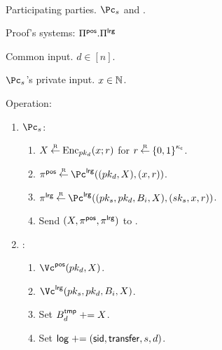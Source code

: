 \begin{protocol}~\label{prot:ConfidentialTransactions:Transfer}
	\item[Participating parties.] $\Pc_s$ and \Cc.
	
	\item[Proof's systems:] $\Pi^{\mathsf{pos}}.\Pi^{\mathsf{lrg}}$
	\item[Common input.] $d \in [n]$.
	
	
	\item[$\Pc_s$'s private  input.] $x \in {\mathbb{N}}$.
	
	\item Operation: 
	
	\begin{enumerate}
		\item  $\Pc_s$: 
		
		\begin{enumerate}
			\item $X \mathbin{\stackrel{\mbox{\tiny R}}{\leftarrow}} \operatorname{Enc}_{pk_d}(x;r)$ for $r \getsr \zo^\ckappa$.
			
			\item $\pi^\posvst \getsr \Pc^\largest((pk_d,X),(x,r))$.
			
			\item $\pi^\largest \getsr \Pc^\largest((pk_s,pk_d,B_i,X),(sk_s,x,r))$.
			
			\item Send $(X,\pi^{\mathsf{pos}},\pi^{\mathsf{lrg}})$ to \Cc.
		\end{enumerate}
		
		
		\item  \Cc: 
		
		\begin{enumerate}
			\item  $\Vc^\posvst(pk_d,X)$.
			
			\item  $\Vc^\largest(pk_s,pk_d,B_i,X)$.
		
		     \item  Set $B_d^{\mathsf{tmp}} \mathrel{+}= X$. 
		     
		     \item Set $\mathsf{log} \mathrel{+}= (\mathsf{sid},\mathsf{transfer},s,d)$.
		\end{enumerate}
		
	\end{enumerate}
	
\end{protocol}

